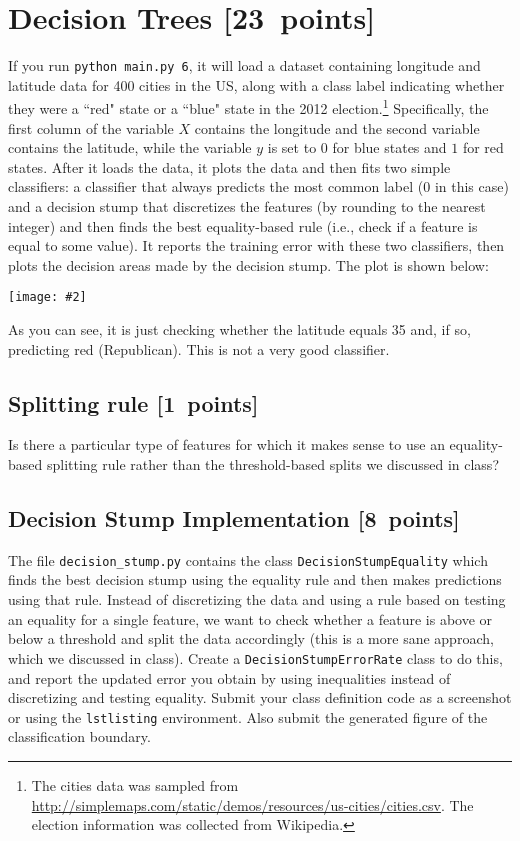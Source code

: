 \documentclass{article}
\newcommand{\blu}[1]{{\textcolor{blu}{#1}}}
\let\ask\blu
\newcommand\pts[1]{\textcolor{pointscolour}{[#1~points]}}
\newcommand{\centerfig}[2]{\begin{center}\texttt{[image: \#2]}\end{center}}
\begin{document}




  \clearpage\section{Decision Trees \pts{23}}

  If you run \texttt{python main.py 6}, it will load a dataset containing longitude
  and latitude data for 400 cities in the US, along with a class label indicating
  whether they were a ``red" state or a ``blue" state in the 2012
  election.\footnote{The cities data was sampled from \url{http://simplemaps.com/static/demos/resources/us-cities/cities.csv}. The election information was collected from Wikipedia.}
  Specifically, the first column of the variable $X$ contains the
  longitude and the second variable contains the latitude,
  while the variable $y$ is set to $0$ for blue states and $1$ for red states.
  After it loads the data, it plots the data and then fits two simple
  classifiers: a classifier that always predicts the
  most common label ($0$ in this case) and a decision stump
  that discretizes the features (by rounding to the nearest integer)
  and then finds the best equality-based rule (i.e., check
  if a feature is equal to some value).
  It reports the training error with these two classifiers, then plots the decision areas made by the decision stump.
  The plot is shown below:

  \centerfig{0.7}{./figs/q6_decisionBoundary}

  As you can see, it is just checking whether the latitude equals 35 and, if so, predicting red (Republican).
  This is not a very good classifier.

  \subsection{Splitting rule \pts{1}}

  Is there a particular type of features for which it makes sense to use an equality-based splitting rule rather than the threshold-based splits we discussed in class?


  \subsection{Decision Stump Implementation \pts{8}}

  The file \texttt{decision\string_stump.py} contains the class \texttt{DecisionStumpEquality} which
  finds the best decision stump using the equality rule and then makes predictions using that
  rule. Instead of discretizing the data and using a rule based on testing an equality for
  a single feature, we want to check whether a feature is above or below a threshold and
  split the data accordingly (this is a more sane approach, which we discussed in class).
  \ask{Create a \texttt{DecisionStumpErrorRate} class to do this, and report the updated error you
  obtain by using inequalities instead of discretizing and testing equality.
  Submit your class definition code as a screenshot or using the \texttt{lstlisting} environment.
  Also submit the generated figure of the classification boundary.}
\end{document}
